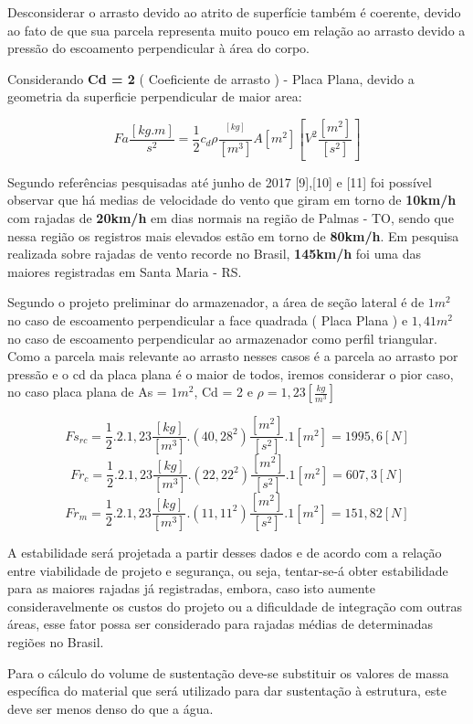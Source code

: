 Desconsiderar o arrasto devido ao atrito de superfície também é coerente, devido ao fato de que sua parcela representa muito pouco em relação ao arrasto devido a pressão do escoamento perpendicular à área do corpo.

Considerando \textbf{Cd = 2} ( Coeficiente de arrasto ) - Placa Plana, devido a geometria da superficie perpendicular de maior area:

\[Fa\frac{[kg.m]}{s^2} = \frac{1}{2}{c_{d}}\rho\frac{^[kg]}{[m^3]}A[m^2][V^2\frac{[m^2]}{[s^2]}]\]

Segundo referências pesquisadas até junho de 2017 [9],[10] e [11]  foi possível observar que há medias de velocidade do vento que giram em torno de \textbf{10km/h} com rajadas de \textbf{20km/h} em dias normais na região de Palmas - TO, sendo que nessa região os registros mais elevados estão em torno de \textbf{80km/h}. Em pesquisa realizada sobre rajadas de vento recorde no Brasil, \textbf{145km/h} foi uma das maiores registradas em Santa Maria - RS.

Segundo o projeto preliminar do armazenador, a área de seção lateral é de $1m^2$ no caso de escoamento perpendicular a face quadrada ( Placa Plana ) e $1,41m^2$ no caso de escoamento perpendicular ao armazenador como perfil triangular. Como a parcela mais relevante ao arrasto nesses casos é a parcela ao arrasto por pressão e o cd da placa plana é o maior de todos, iremos considerar o pior caso, no caso placa plana de As = $1m^2$,  Cd = 2 e $\rho = 1,23 [\frac{kg}{m^3}]$

\[Fs_{rc} = \frac{1}{2}.2.1,23 \frac{[kg]}{[m^3]}.(40,28^2)\frac{[m^2]}{[s^2]} .1[m^2] = 1995,6[N]\]
\[Fr_{c} = \frac{1}{2}.2.1,23 \frac{[kg]}{[m^3]}.(22,22^2)\frac{[m^2]}{[s^2]} .1[m^2] = 607,3[N]\]
\[Fr_{m} = \frac{1}{2}.2.1,23 \frac{[kg]}{[m^3]}.(11,11^2)\frac{[m^2]}{[s^2]} .1[m^2] = 151,82[N]\]

A estabilidade será projetada a partir desses dados e de acordo com a relação entre viabilidade de projeto e segurança, ou seja, tentar-se-á obter estabilidade para as maiores rajadas já registradas, embora, caso isto aumente consideravelmente os custos do projeto ou a dificuldade de integração com outras áreas, esse fator possa ser considerado para rajadas médias de determinadas regiões no Brasil.

Para o cálculo do volume de sustentação deve-se substituir os valores de massa específica do material que será utilizado para dar sustentação à estrutura, este deve ser menos denso do que a água.

